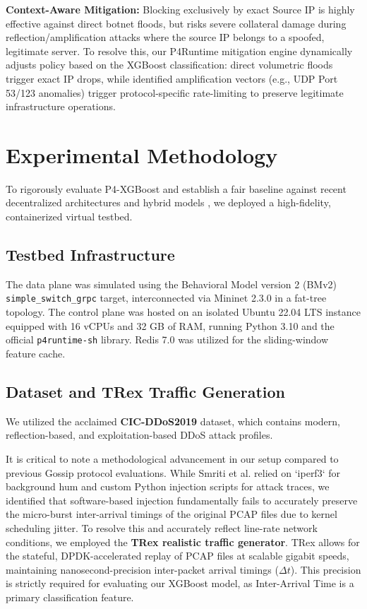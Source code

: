 \documentclass[sigconf, nonacm]{acmart}
\begin{document}
\textbf{Context-Aware Mitigation:} Blocking exclusively by exact Source IP is highly effective against direct botnet floods, but risks severe collateral damage during reflection/amplification attacks where the source IP belongs to a spoofed, legitimate server. To resolve this, our P4Runtime mitigation engine dynamically adjusts policy based on the XGBoost classification: direct volumetric floods trigger exact IP drops, while identified amplification vectors (e.g., UDP Port 53/123 anomalies) trigger protocol-specific rate-limiting to preserve legitimate infrastructure operations.

\section{Experimental Methodology}

To rigorously evaluate P4-XGBoost and establish a fair baseline against recent decentralized architectures \cite{smriti2026, smriti2023} and hybrid models \cite{poseidon, flowlens}, we deployed a high-fidelity, containerized virtual testbed.

\subsection{Testbed Infrastructure}
The data plane was simulated using the Behavioral Model version 2 (BMv2) \texttt{simple\_switch\_grpc} target, interconnected via Mininet 2.3.0 in a fat-tree topology. The control plane was hosted on an isolated Ubuntu 22.04 LTS instance equipped with 16 vCPUs and 32 GB of RAM, running Python 3.10 and the official \texttt{p4runtime-sh} library. Redis 7.0 was utilized for the sliding-window feature cache.

\subsection{Dataset and TRex Traffic Generation}
We utilized the acclaimed \textbf{CIC-DDoS2019} dataset, which contains modern, reflection-based, and exploitation-based DDoS attack profiles. 

It is critical to note a methodological advancement in our setup compared to previous Gossip protocol evaluations. While Smriti et al. \cite{smriti2026} relied on `iperf3` for background hum and custom Python injection scripts for attack traces, we identified that software-based injection fundamentally fails to accurately preserve the micro-burst inter-arrival timings of the original PCAP files due to kernel scheduling jitter. To resolve this and accurately reflect line-rate network conditions, we employed the \textbf{TRex realistic traffic generator}. TRex allows for the stateful, DPDK-accelerated replay of PCAP files at scalable gigabit speeds, maintaining nanosecond-precision inter-packet arrival timings ($\Delta t$). This precision is strictly required for evaluating our XGBoost model, as Inter-Arrival Time is a primary classification feature.
\end{document}
